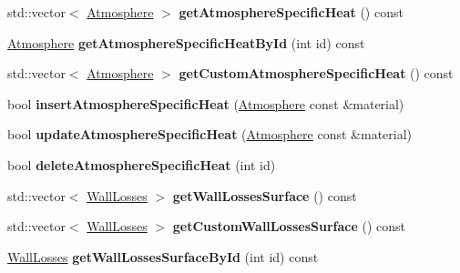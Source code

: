 \begin{DoxyCompactItemize}
\item 
\mbox{\label{class_s_q_lite_a04d22b056b51fb07d192833806eabdfc}} 
std\+::vector$<$ \hyperlink{class_atmosphere}{Atmosphere} $>$ {\bfseries get\+Atmosphere\+Specific\+Heat} () const
\item 
\mbox{\label{class_s_q_lite_ae468835cffed182bb9819299463c53b7}} 
\hyperlink{class_atmosphere}{Atmosphere} {\bfseries get\+Atmosphere\+Specific\+Heat\+By\+Id} (int id) const
\item 
\mbox{\label{class_s_q_lite_adecfb81514a3fa09237baa50b2edf5e7}} 
std\+::vector$<$ \hyperlink{class_atmosphere}{Atmosphere} $>$ {\bfseries get\+Custom\+Atmosphere\+Specific\+Heat} () const
\item 
\mbox{\label{class_s_q_lite_a5be90371486d63abd80668c19682051b}} 
bool {\bfseries insert\+Atmosphere\+Specific\+Heat} (\hyperlink{class_atmosphere}{Atmosphere} const \&material)
\item 
\mbox{\label{class_s_q_lite_a0980ef2dfdaadb27f86342f983019bb7}} 
bool {\bfseries update\+Atmosphere\+Specific\+Heat} (\hyperlink{class_atmosphere}{Atmosphere} const \&material)
\item 
\mbox{\label{class_s_q_lite_a32f61e2c425864cf222ee427abd33448}} 
bool {\bfseries delete\+Atmosphere\+Specific\+Heat} (int id)
\item 
\mbox{\label{class_s_q_lite_ac385b0462588b7a18349d1621ceac57c}} 
std\+::vector$<$ \hyperlink{class_wall_losses}{Wall\+Losses} $>$ {\bfseries get\+Wall\+Losses\+Surface} () const
\item 
\mbox{\label{class_s_q_lite_aaf414f89916731a94d8c81a98d36987d}} 
std\+::vector$<$ \hyperlink{class_wall_losses}{Wall\+Losses} $>$ {\bfseries get\+Custom\+Wall\+Losses\+Surface} () const
\item 
\mbox{\label{class_s_q_lite_a3a7f473d8e23630dae65cd3c3dd7fa97}} 
\hyperlink{class_wall_losses}{Wall\+Losses} {\bfseries get\+Wall\+Losses\+Surface\+By\+Id} (int id) const
\item 
\mbox{\label{class_s_q_lite_a97d510f6f16aa70c61a9dc6a629ad786}} 

\end{DoxyCompactItemize}
